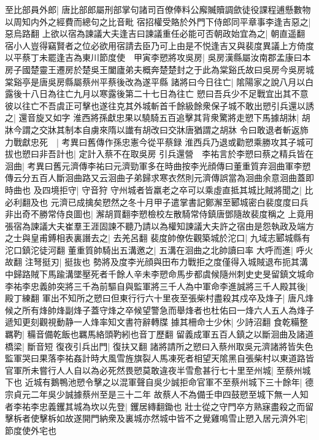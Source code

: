 至比部員外郎|{
	唐比部郎屬刑部掌句諸司百僚俸料公廨贓贖調歛徒役課程逋懸數物以周知内外之經費而總句之比音毗}
宿招權受賂於外門下侍郎同平章事李逢吉惡之|{
	惡烏路翻}
上欲以宿為諫議大夫逢吉曰諫議重任必能可否朝政始宜為之|{
	朝直遥翻}
宿小人豈得竊賢者之位必欲用宿請去臣乃可上由是不悦逢吉又與裴度異議上方倚度以平蔡丁未罷逢吉為東川節度使　甲寅李愬將攻吳房|{
	吳房漢縣屬汝南郡孟康曰本房子國楚靈王遷房於楚吳王闔廬弟夫概奔楚楚封之于此為棠谿氏故曰吳房今吳房城棠谿亭是唐吳房縣屬蔡州平蔡後改為遂平縣}
諸將曰今日往亡|{
	隂陽家之說八月以白露後十八日為往亡九月以寒露後第二十七日為往亡}
愬曰吾兵少不足戰宜出其不意彼以往亡不吾虞正可擊也遂往克其外城斬首千餘級餘衆保子城不敢出愬引兵還以誘之|{
	還音旋又如字}
淮西將孫獻忠果以驍騎五百追擊其背衆驚將走愬下馬據胡牀|{
	胡牀今謂之交牀其制本自虜來隋以䜟有胡改曰交牀唐猶謂之胡牀}
令曰敢退者斬返斾力戰獻忠死　|{
	考異曰舊傳作孫忠憲今從平蔡録}
淮西兵乃退或勸愬乘勝攻其子城可拔也愬曰非吾計也|{
	定計入蔡不在取吳房}
引兵還營　李祐言於李愬曰蔡之精兵皆在洄曲|{
	考異曰舊元濟傳李祐曰元濟勁軍多在時曲按李光顔傳曰董重質弃洄曲軍李愬傳云分五百人斷洄曲路又云洄曲子弟歸求寒衣然則元濟傳誤當為洄曲余意洄曲蓋即時曲也}
及四境拒守|{
	守音狩}
守州城者皆羸老之卒可以乘虛直抵其城比賊將聞之|{
	比必利翻及也}
元濟已成擒矣愬然之冬十月甲子遣掌書記鄭澥至郾城密白裴度度曰兵非出奇不勝常侍良圖也|{
	澥胡買翻李愬檢校左散騎常侍鎮唐鄧隨故裴度稱之}
上竟用張宿為諫議大夫崔羣王涯固諫不聽乃請以為權知諫議大夫許之宿由是怨執政及端方之士與皇甫鎛相表裏譖去之|{
	去羌呂翻}
裴度帥僚佐觀築城於沱口|{
	九域志郾城縣有沱口鎮沱徒河翻}
董重質帥騎出五溝邀之|{
	五溝在洄曲之北帥讀曰率}
大呼而進|{
	呼火故翻}
注弩挺刃|{
	挺抜也}
勢將及度李光顔與田布力戰拒之度僅得入城賊退布扼其溝中歸路賊下馬踰溝墜壓死者千餘人辛未李愬命馬步都虞候隨州刺史史旻留鎮文城命李祐李忠義帥突將三千為前驅自與監軍將三千人為中軍命李進誠將三千人殿其後|{
	殿丁練翻}
軍出不知所之愬曰但東行行六十里夜至張柴村盡殺其戍卒及烽子|{
	唐凡烽候之所有烽帥烽副烽子蓋守烽之卒候望警急而舉烽者也杜佑曰一烽六人五人為烽子遞知更刻觀視動静一人烽率知文書符辭轉牒}
據其柵命士少休|{
	少詩沼翻}
食乾糒整羈靮|{
	糒音備乾飯也羈馬絡頭靮紖也音丁歷翻}
留義成軍五百人鎮之以斷洄曲及諸道橋梁|{
	斷音短}
復夜引兵出門|{
	復扶又翻}
諸將請所之愬曰入蔡州取吳元濟諸將皆失色監軍哭曰果落李祐姦計時大風雪旌旗裂人馬凍死者相望天隂黑自張柴村以東道路皆官軍所未嘗行人人自以為必死然畏愬莫敢違夜半雪愈甚行七十里至州城|{
	至蔡州城下也}
近城有鵝鴨池愬令擊之以混軍聲自吳少誠拒命官軍不至蔡州城下三十餘年|{
	德宗貞元二年吳少誠據蔡州至是三十二年}
故蔡人不為備壬申四鼓愬至城下無一人知者李祐李忠義钁其城為坎以先登|{
	钁居縳翻鋤也}
壯士從之守門卒方熟寐盡殺之而留擊柝者使擊柝如故遂開門納衆及裏城亦然城中皆不之覺雞鳴雪止愬入居元濟外宅|{
	節度使外宅也}
